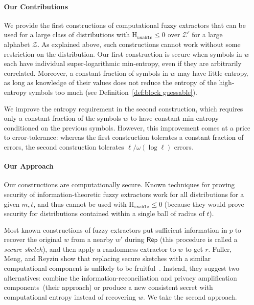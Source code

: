 \documentclass[11pt]{article}
\newcommand{\defref}[1]{\mbox{Definition~\ref{#1}}}
\newcommand{\class}[1]{{\ensuremath{\mathsf{#1}}}}
\newcommand{\rep}{\ensuremath{\class{Rep}}\xspace}
\newcommand{\Huse}{\mathrm{H}_{\mathtt{usable}}}
\begin{document}
\paragraph{Our Contributions}
We provide the first constructions of computational fuzzy extractors that can be used for a large class of distributions with $\Huse\le 0$ over $\mathcal{Z}^\ell$ for a large alphabet $\mathcal{Z}$.  As explained above, such constructions cannot work without some restriction on the distribution.
Our first construction is secure when symbols in $w$
each have individual super-logarithmic min-entropy, even if they are arbitrarily correlated. Moreover,
a constant fraction of symbols in $w$ may have little entropy, as long as knowledge of their values does not reduce the entropy of the high-entropy symbols too much (see \defref{def:block guessable}).

We improve the entropy requirement in the second construction, which requires only a constant fraction of the symbols $w$ to have constant min-entropy conditioned on the previous symbols.
However, this improvement comes at a price to error-tolerance: whereas the first construction tolerates a constant fraction of errors, the second construction tolerates $\ell/\omega(\log\ell)$ errors.



\paragraph{Our Approach}
Our constructions are computationally secure.  Known techniques for proving security of information-theoretic  fuzzy extractors work for all distributions for a given $m, t$, and thus cannot be used with $\Huse\le 0$ (because they would prove security for distributions contained within a single ball of radius of $t$). 

Most known constructions of fuzzy extractors put sufficient information in $p$ to recover the original $w$ from a nearby $w'$ during $\rep$ (this procedure is called a \emph{secure sketch}), and then apply a randomness extractor to $w$ to get $r$.
Fuller, Meng, and Reyzin show that replacing secure sketches with a similar computational component is unlikely to be fruitful~\cite[Corollary 3.8, Theorem 3.10]{fuller2013computational}.  Instead, they suggest two alternatives: combine the information-reconciliation and privacy amplification components~(their approach) or produce a new consistent secret with computational entropy instead of recovering $w$.  We take the second approach.
\end{document}
